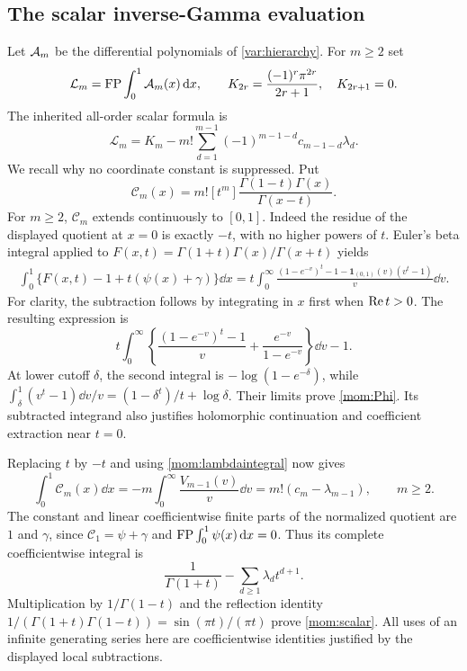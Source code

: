 \subsection{The scalar inverse-Gamma evaluation}

Let $\mathcal A_m$ be the differential polynomials of
\eqref{var:hierarchy}. For $m\ge2$ set
\[
 \mathcal L_m=\operatorname{FP}\int_0^1\mathcal A_m(x)\,\mathrm d x,
 \qquad K_{2r}=\frac{(-1)^r\pi^{2r}}{2r+1},\quad K_{2r+1}=0.
\]
The inherited all-order scalar formula is
\begin{equation}\label{mom:scalar}
 \boxed{\displaystyle
 \mathcal L_m=K_m-m!\sum_{d=1}^{m-1}
                (-1)^{m-1-d}c_{m-1-d}\lambda_d.}
\end{equation}
We recall why no coordinate constant is suppressed. Put
\[
 \mathcal C_m(x)=m![t^m]
                  \frac{\Gamma(1-t)\Gamma(x)}{\Gamma(x-t)}.
\]
For $m\ge2$, $\mathcal C_m$ extends continuously to $[0,1]$.
Indeed the residue of the displayed quotient at $x=0$ is exactly
$-t$, with no higher powers of $t$. Euler's beta integral applied to
$F(x,t)=\Gamma(1+t)\Gamma(x)/\Gamma(x+t)$ yields
\begin{align}\label{mom:Phi}
 \int_0^1\{F(x,t)-1+t(\psi(x)+\gamma)\}\dd x
 =t\int_0^\infty
 \frac{(1-e^{-v})^t-1
       -\boldsymbol1_{(0,1)}(v)(v^t-1)}v\dd v.
\end{align}
For clarity, the subtraction follows by integrating in $x$ first
when $\operatorname{Re} t>0$. The resulting expression is
\[
 t\int_0^\infty
 \left\{\frac{(1-e^{-v})^t-1}{v}
             +\frac{e^{-v}}{1-e^{-v}}\right\}\dd v-1.
\]
At lower cutoff $\delta$, the second integral is
$-\log(1-e^{-\delta})$, while
$\int_\delta^1(v^t-1)\dd v/v=(1-\delta^t)/t+\log\delta$.
Their limits prove \eqref{mom:Phi}. Its subtracted integrand also
justifies holomorphic continuation and coefficient extraction near
$t=0$.

Replacing $t$ by $-t$ and using \eqref{mom:lambdaintegral} now gives
\[
 \int_0^1\mathcal C_m(x)\dd x
 =-m\int_0^\infty\frac{V_{m-1}(v)}v\dd v
 =m!(c_m-\lambda_{m-1}),\qquad m\ge2.
\]
The constant and linear coefficientwise finite parts of the normalized
quotient are $1$ and $\gamma$, since
$\mathcal C_1=\psi+\gamma$ and $\operatorname{FP}\int_0^1\psi(x)\,\mathrm d x=0$.
Thus its complete coefficientwise integral is
\[
 \frac1{\Gamma(1+t)}-\sum_{d\ge1}\lambda_dt^{d+1}.
\]
Multiplication by $1/\Gamma(1-t)$ and the reflection identity
$1/(\Gamma(1+t)\Gamma(1-t))=\sin(\pi t)/(\pi t)$ prove
\eqref{mom:scalar}. All uses of an infinite generating series here
are coefficientwise identities justified by the displayed local
subtractions.

